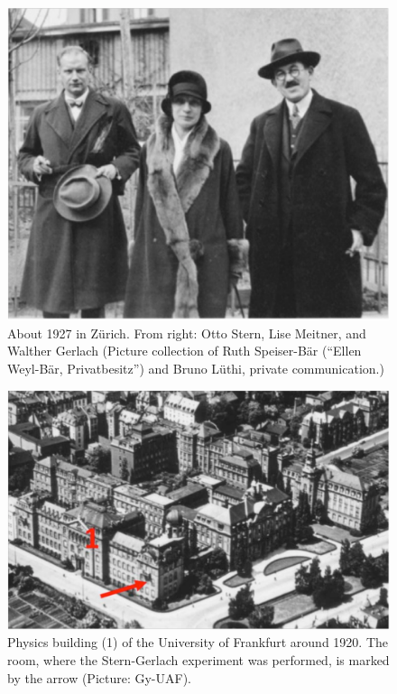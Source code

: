 \documentclass[12pt]{article}
\begin{document}
\begin{figure}
\begin{center}
\includegraphics[scale=0.5]{figures/SternMeitnerGerlach}
\caption{About 1927 in Zürich. From right: Otto Stern, Lise Meitner, and Walther Gerlach (Picture collection of Ruth Speiser-Bär (``Ellen Weyl-Bär, Privatbesitz'') and Bruno Lüthi,  private communication.)}
\label{fig:SternMeitnerGerlach}
\end{center}
\end{figure}
%
\begin{figure}
\begin{center}
\includegraphics[scale=0.45]{figures/Physics_building}
\caption{Physics building (1) of the University of Frankfurt around 1920. The room, where the Stern-Gerlach experiment was performed, is marked by the arrow (Picture: Gy-UAF).}
\label{fig:physics_building}
\end{center}
\end{figure}
\end{document}
